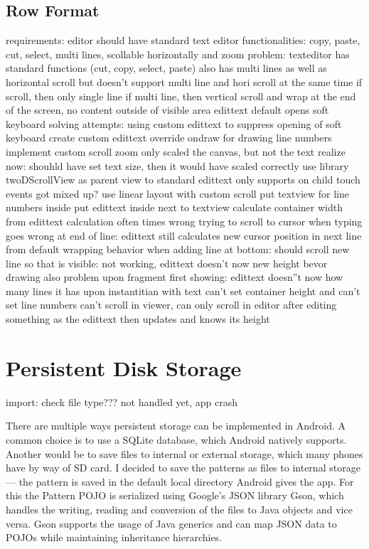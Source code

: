 \subsection{Row Format}
requirements: 
	editor should have standard text editor functionalities: copy, paste, cut, select, multi lines, scollable horizontally and zoom
problem:
	texteditor has standard functions (cut, copy, select, paste) 
	also has multi lines as well as horizontal scroll
	but doesn't support multi line and hori scroll at the same time
	if scroll, then only single line
	if multi line, then vertical scroll and wrap at the end of the screen, no content outside of visible area
	edittext default opens soft keyboard
solving attempts:
	using custom edittext to suppress opening of soft keyboard  
	create custom edittext 
		override ondraw for drawing line numbers
		implement custom scroll
		zoom only scaled the canvas, but not the text
		realize now: shouhld have set text size, then it would have scaled correctly
	use library twoDScrollView as parent view to standard edittext
		only supports on child
		touch events got mixed up?
	use linear layout with custom scroll
		put textview for line numbers inside
		put edittext inside next to textview
		calculate container width from edittext
		calculation often times wrong
		trying to scroll to cursor when typing goes wrong at end of line: edittext still calculates new cursor position in next line from default wrapping behavior
		when adding line at bottom: should scroll new line so that is visible: not working, edittext doesn't now new height bevor drawing
		also problem upon fragment first showing: edittext doesn''t now how many lines it has upon instantitian with text 
		can't set container height and can't set line numbers
		can't scroll in viewer, can only scroll in editor after editing something as the edittext then updates and knows its height

\section{Persistent Disk Storage}
import: check file type??? not handled yet, app crash

There are multiple ways persistent storage can be implemented in Android. A common choice is to use a SQLite database, which Android natively supports. Another would be to save files to internal or external storage, which many phones have by way of SD card.
I decided to save the patterns as files to internal storage --- the pattern is saved in the default local directory Android gives the app. For this the Pattern POJO is serialized using Google’s JSON library Gson, which handles the writing, reading and conversion of the files to Java objects and vice versa. Gson supports the usage of Java generics and can map JSON data to POJOs while maintaining inheritance hierarchies.

